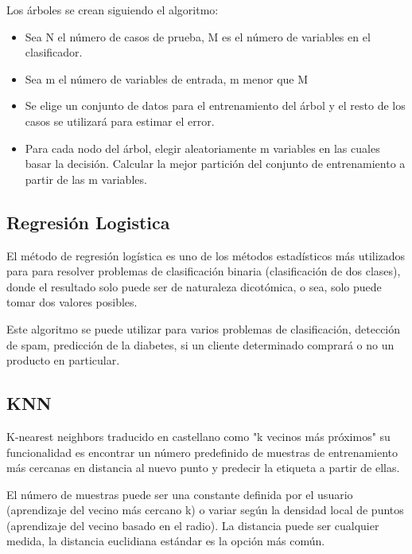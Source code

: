 Los árboles se crean siguiendo el algoritmo:


\begin{itemize}
\item Sea N el número de casos de prueba, M es el número de variables en el clasificador.
\item Sea m el número de variables de entrada, m menor que M
\item Se elige un conjunto de datos para el entrenamiento del árbol y el resto de los casos se utilizará para estimar el error.
\item Para cada nodo del árbol, elegir aleatoriamente m variables en las cuales basar la decisión. Calcular la mejor partición del conjunto de entrenamiento a partir de las m variables.
\end{itemize}

\subsection{Regresión Logistica}

El método de regresión logística es uno de los métodos estadísticos más utilizados para para resolver problemas de clasificación binaria (clasificación de dos clases), donde el resultado solo puede ser de naturaleza dicotómica, o sea, solo puede tomar dos valores posibles.

Este algoritmo se puede utilizar para varios problemas de clasificación, detección de spam, predicción de la diabetes, si un cliente determinado comprará o no un producto en particular.

\subsection{KNN}

K-nearest neighbors traducido en castellano como "k vecinos más próximos" su funcionalidad es encontrar un número predefinido de muestras de entrenamiento más cercanas en distancia al nuevo punto y predecir la etiqueta a partir de ellas. 


El número de muestras puede ser una constante definida por el usuario (aprendizaje del vecino más cercano k) o variar según la densidad local de puntos (aprendizaje del vecino basado en el radio). La distancia puede ser cualquier medida, la distancia euclidiana estándar es la opción más común.

